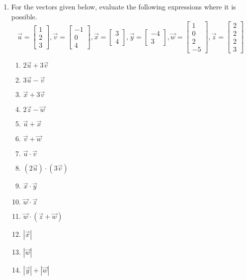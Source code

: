 \documentclass[12pt,a4paper]{article}
\begin{document}
\begin{enumerate}
	\item For the vectors given below, evaluate the following expressions where it is possible.
	\begin{equation*}
	\vec{u}=\left[ \begin{array}{c} 1 \\ 2 \\ 3 \end{array}\right],
	\vec{v}=\left[ \begin{array}{c} -1 \\ 0 \\ 4 \end{array}\right],
	\vec{x}=\left[ \begin{array}{c} 3 \\ 4 \end{array}\right],
	\vec{y}=\left[ \begin{array}{c} -4 \\ 3 \end{array}\right],
	\vec{w}=\left[ \begin{array}{c} 1 \\ 0\\ 2 \\ -5 \end{array}\right],
	\vec{z}=\left[ \begin{array}{c} 2 \\ 2 \\ 2 \\ 3 \end{array}\right]
	\end{equation*}
	\begin{multicols}{3}
		\begin{enumerate}
			\item $2\vec{u} + 3\vec{v}$
			\item $3\vec{u} - \vec{v}$
			\item $\vec{x} + 3\vec{v}$
			\item $2\vec{z} - \vec{w}$
			\item $\vec{u}+\vec{x}$
			\item $\vec{v}+\vec{w}$
			\item $\vec{u}\cdot \vec{v}$
			\item $\left(2\vec{u}\right)\cdot \left(3\vec{v}\right)$
			\item $\vec{x}\cdot \vec{y}$
			\item $\vec{w} \cdot \vec{z}$
			\item $\vec{w} \cdot (\vec{z}+\vec{w})$
			\item $|\vec{x}|$
			\item $|\vec{w}|$
			\item $|\vec{y}|+|\vec{w}|$
		\end{enumerate}
	\end{multicols}
	

\end{enumerate}
\end{document}
